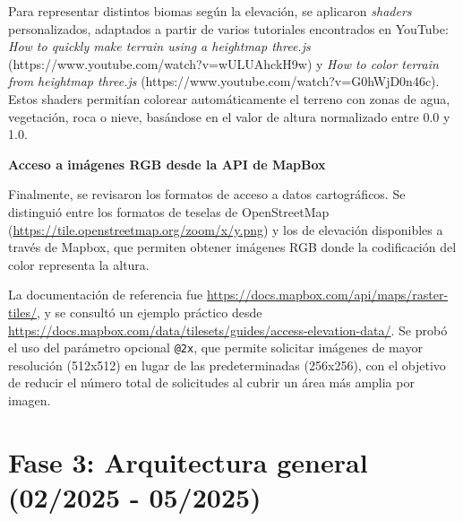 \documentclass[a4paper, 12pt]{book}
\begin{document}
Para representar distintos biomas según la elevación, se aplicaron \textit{shaders} personalizados, adaptados a partir de varios tutoriales encontrados en YouTube: \textit{How to quickly make terrain using a heightmap three.js} (https://www.youtube.com/watch?v=wULUAhckH9w) y \textit{How to color terrain from heightmap three.js} (https://www.youtube.com/watch?v=G0hWjD0n46c). Estos shaders permitían colorear automáticamente el terreno con zonas de agua, vegetación, roca o nieve, basándose en el valor de altura normalizado entre 0.0 y 1.0.

\vspace{0.5em}
\textbf{Acceso a imágenes RGB desde la API de MapBox}

Finalmente, se revisaron los formatos de acceso a datos cartográficos. Se distinguió entre los formatos de teselas de OpenStreetMap (\url{https://tile.openstreetmap.org/zoom/x/y.png}) y los de elevación disponibles a través de Mapbox, que permiten obtener imágenes RGB donde la codificación del color representa la altura.

La documentación de referencia fue \url{https://docs.mapbox.com/api/maps/raster-tiles/}, y se consultó un ejemplo práctico desde \url{https://docs.mapbox.com/data/tilesets/guides/access-elevation-data/}. Se probó el uso del parámetro opcional \texttt{@2x}, que permite solicitar imágenes de mayor resolución (512x512) en lugar de las predeterminadas (256x256), con el objetivo de reducir el número total de solicitudes al cubrir un área más amplia por imagen.

\section{Fase 3: Arquitectura general (02/2025 - 05/2025)} 
\label{sec:arquitectura}




\end{document}

